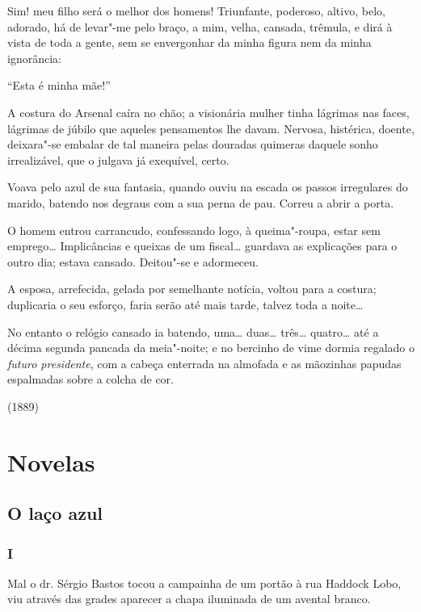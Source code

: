 Sim! meu filho será o melhor dos homens! Triunfante, poderoso, altivo,
belo, adorado, há de levar"-me pelo braço, a mim, velha, cansada,
trêmula, e dirá à vista de toda a gente, sem se envergonhar da minha
figura nem da minha ignorância:

``Esta é minha mãe!''

A costura do Arsenal caíra no chão; a visionária mulher tinha lágrimas
nas faces, lágrimas de júbilo que aqueles pensamentos lhe davam.
Nervosa, histérica, doente, deixara"-se embalar de tal maneira pelas
douradas quimeras daquele sonho irrealizável, que o julgava já
exequível, certo.

Voava pelo azul de sua fantasia, quando ouviu na escada os passos
irregulares do marido, batendo nos degraus com a sua perna de pau.
Correu a abrir a porta.

O homem entrou carrancudo, confessando logo, à queima"-roupa, estar sem
emprego\ldots{} Implicâncias e queixas de um fiscal\ldots{} guardava as
explicações para o outro dia; estava cansado. Deitou"-se e adormeceu.

A esposa, arrefecida, gelada por semelhante notícia, voltou para a
costura; duplicaria o seu esforço, faria serão até mais tarde, talvez
toda a noite\ldots{}

No entanto o relógio cansado ia batendo, uma\ldots{} duas\ldots{} três\ldots{}
quatro\ldots{} até a décima segunda pancada da meia"-noite; e no bercinho de
vime dormia regalado o \emph{futuro presidente}, com a cabeça enterrada
na almofada e as mãozinhas papudas espalmadas sobre a colcha de cor.

(1889)

\part{Novelas}

\chapter[O laço azul]{O laço azul}



\section{I}

Mal o dr. Sérgio Bastos tocou a campainha de um portão à rua Haddock
Lobo, viu através das grades aparecer a chapa iluminada de um avental
branco.

